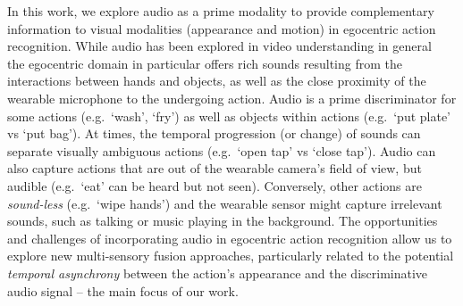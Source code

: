 \documentclass[10pt,twocolumn,letterpaper]{article}
\begin{document}
In this work, we explore audio as
a prime modality to provide complementary information to visual
modalities (appearance and motion) in egocentric action recognition. While audio has been explored in video understanding in general ~\cite{ObjectSound,AytarVT16,ArandjelovicZ17,Owens0MFT16,AVEearlyFusion,AytarVT17,VoicesFaces,TextVideo,Senocak_2018_CVPR,gao2019visual-sound} the egocentric domain in particular offers rich sounds resulting from the interactions between hands and objects, as well as the close proximity of the wearable microphone to the undergoing action. Audio is a prime discriminator for some actions (e.g.\ `wash', `fry') as well as objects within actions (e.g.\ `put plate' vs `put bag').
At times, the temporal progression (or change) of sounds can separate visually ambiguous actions (e.g.\ `open tap' vs `close tap'). 
Audio can also capture actions that are out of the wearable camera's field of view, but audible (e.g.\ `eat' can be heard but not seen).
Conversely, other actions are \textit{sound-less} (e.g.\ `wipe hands') and the wearable sensor might capture irrelevant sounds, such as talking or music playing in the background.
The opportunities and challenges of incorporating audio in egocentric action recognition allow us to explore new multi-sensory fusion approaches, particularly related to the potential \textit{temporal asynchrony} between the action's appearance and the discriminative audio signal -- the main focus of our work.
\end{document}
